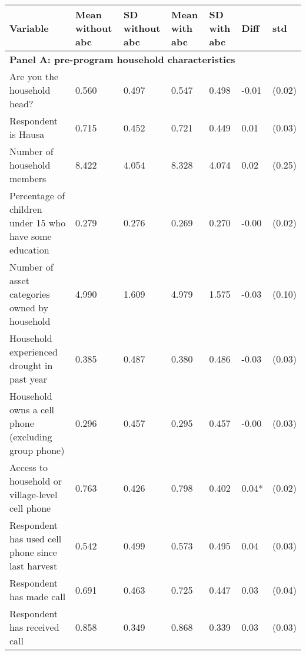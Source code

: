 \begin{tabular}{lllllll}
\toprule
Variable & Mean without abc & SD without abc & Mean with abc & SD with abc & Diff & std \\
\midrule
\multicolumn{7}{l}{\textbf{Panel A: pre-program household characteristics}}  \\
Are you the household head? & 0.560 & 0.497 & 0.547 & 0.498 & -0.01 & (0.02) \\
Respondent is Hausa & 0.715 & 0.452 & 0.721 & 0.449 & 0.01 & (0.03) \\
Number of household members & 8.422 & 4.054 & 8.328 & 4.074 & 0.02 & (0.25) \\
Percentage of children under 15 who have some education & 0.279 & 0.276 & 0.269 & 0.270 & -0.00 & (0.02) \\
Number of asset categories owned by household & 4.990 & 1.609 & 4.979 & 1.575 & -0.03 & (0.10) \\
Household experienced drought in past year & 0.385 & 0.487 & 0.380 & 0.486 & -0.03 & (0.03) \\
Household owns a cell phone (excluding group phone) & 0.296 & 0.457 & 0.295 & 0.457 & -0.00 & (0.03) \\
Access to household or village-level cell phone & 0.763 & 0.426 & 0.798 & 0.402 & 0.04* & (0.02) \\
Respondent has used cell phone since last harvest & 0.542 & 0.499 & 0.573 & 0.495 & 0.04 & (0.03) \\
Respondent has made call & 0.691 & 0.463 & 0.725 & 0.447 & 0.03 & (0.04) \\
Respondent has received call & 0.858 & 0.349 & 0.868 & 0.339 & 0.03 & (0.03) \\
\bottomrule
\end{tabular}
